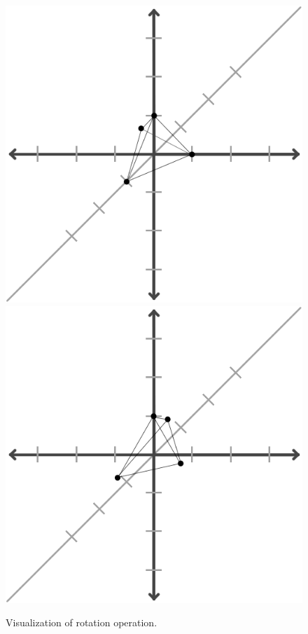 \documentclass{article}
\begin{document}
	\begin{figure}[H]
		\centering
		\includegraphics{img/scaling_before-rotation_before.png}
		\includegraphics{img/rotation_after.png}
		\caption{Visualization of rotation operation.}
	\end{figure}
\end{document}
